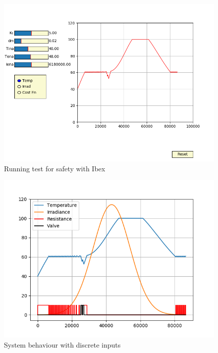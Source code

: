 \begin{figure}
    \includegraphics[width=\linewidth]{8}
    \caption{Running test for safety with Ibex}
    \label{fig:4}
\end{figure}

\begin{figure}
    \includegraphics[width=\linewidth]{9}
    \caption{System behaviour with discrete inputs}
    \label{fig:5}
\end{figure}


